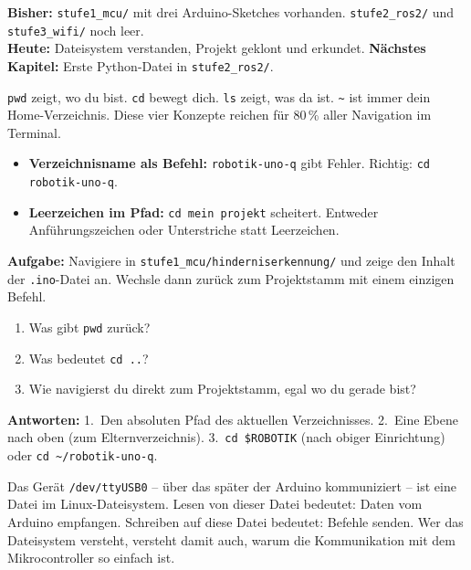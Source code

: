\begin{projektBox}
\textbf{Bisher:} \texttt{stufe1\_mcu/} mit drei Arduino-Sketches vorhanden.
\texttt{stufe2\_ros2/} und \texttt{stufe3\_wifi/} noch leer.\\
\textbf{Heute:} Dateisystem verstanden, Projekt geklont und erkundet.
\textbf{Nächstes Kapitel:} Erste Python-Datei in \texttt{stufe2\_ros2/}.
\end{projektBox}

\begin{merksatzBox}
\texttt{pwd} zeigt, wo du bist. \texttt{cd} bewegt dich.
\texttt{ls} zeigt, was da ist. \texttt{\textasciitilde} ist immer
dein Home-Verzeichnis. Diese vier Konzepte reichen für
80\,\% aller Navigation im Terminal.
\end{merksatzBox}

\begin{fehlerBox}
\begin{itemize}
  \item \textbf{Verzeichnisname als Befehl:} \texttt{robotik-uno-q}
        gibt Fehler. Richtig: \texttt{cd robotik-uno-q}.
  \item \textbf{Leerzeichen im Pfad:} \texttt{cd mein projekt}
        scheitert. Entweder Anführungszeichen oder
        Unterstriche statt Leerzeichen.
\end{itemize}
\end{fehlerBox}

\begin{uebungBox}
\textbf{Aufgabe:} Navigiere in
\texttt{stufe1\_mcu/hinderniserkennung/} und zeige den Inhalt
der \texttt{.ino}-Datei an. Wechsle dann zurück zum
Projektstamm mit einem einzigen Befehl.
\end{uebungBox}

\begin{quizBox}
\begin{enumerate}
  \item Was gibt \texttt{pwd} zurück?
  \item Was bedeutet \texttt{cd ..}?
  \item Wie navigierst du direkt zum Projektstamm, egal
        wo du gerade bist?
\end{enumerate}
\textbf{Antworten:} 1.~Den absoluten Pfad des aktuellen Verzeichnisses.
2.~Eine Ebene nach oben (zum Elternverzeichnis).
3.~\texttt{cd \$ROBOTIK} (nach obiger Einrichtung) oder
\texttt{cd \textasciitilde/robotik-uno-q}.
\end{quizBox}

\begin{robotikBox}
Das Gerät \texttt{/dev/ttyUSB0} -- über das später der Arduino
kommuniziert -- ist eine Datei im Linux-Dateisystem.
Lesen von dieser Datei bedeutet: Daten vom Arduino empfangen.
Schreiben auf diese Datei bedeutet: Befehle senden.
Wer das Dateisystem versteht, versteht damit auch,
warum die Kommunikation mit dem Mikrocontroller so einfach ist.
\end{robotikBox}

